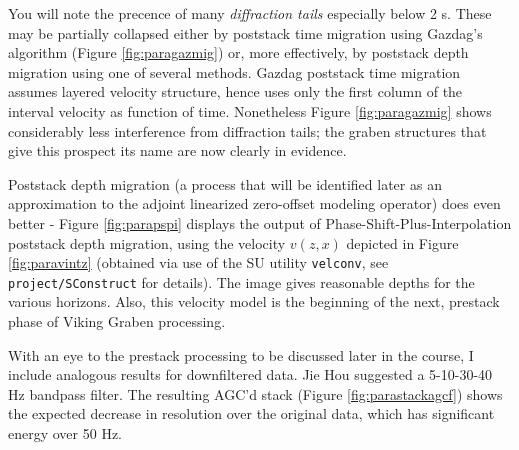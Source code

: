 You will note the precence of many {\em diffraction tails} especially below 2 s. These may be partially collapsed either by poststack time migration using Gazdag's algorithm (Figure \ref{fig:paragazmig}) or, more effectively, by poststack depth migration using one of several methods. Gazdag poststack time migration assumes layered velocity structure, hence uses only the first column of the interval velocity as function of time. Nonetheless Figure \ref{fig:paragazmig} shows considerably less interference from diffraction tails; the graben structures that give this prospect its name are now clearly in evidence. 


Poststack depth migration (a process that will be identified later as an approximation to the adjoint linearized zero-offset modeling operator) does even better - Figure \ref{fig:parapspi} displays the output of Phase-Shift-Plus-Interpolation poststack depth migration, using the velocity $v(z,x)$ depicted in Figure \ref{fig:paravintz} (obtained via use of the SU utility {\tt velconv}, see {\tt project/SConstruct} for details). The image gives reasonable depths for the various horizons. Also, this velocity model is the beginning of the next, prestack phase of Viking Graben processing.



With an eye to the prestack processing to be discussed later in the course, I include analogous results for downfiltered data. Jie Hou suggested a 5-10-30-40 Hz bandpass filter. The resulting AGC'd stack (Figure \ref{fig:parastackagcf}) shows the expected decrease in resolution over the original data, which has significant energy over 50 Hz. 


